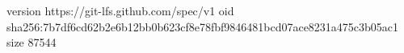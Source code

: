 version https://git-lfs.github.com/spec/v1
oid sha256:7b7df6cd62b2e6b12bb0b623cf8e78fbf9846481bcd07ace8231a475c3b05ac1
size 87544
